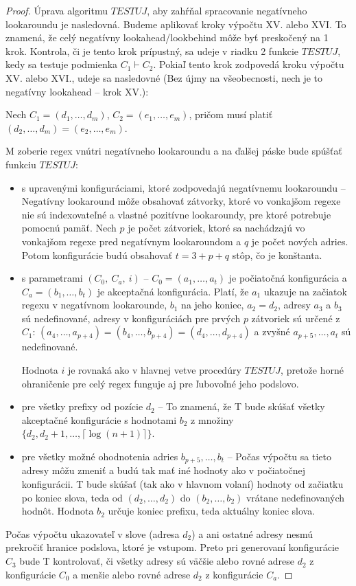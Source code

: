 \begin{proof}
Úprava algoritmu $TESTUJ$, aby zahŕňal spracovanie negatívneho lookaroundu je nasledovná. Budeme aplikovať kroky výpočtu XV. alebo XVI. To znamená, že celý negatívny lookahead/lookbehind môže byť preskočený na 1 krok. Kontrola, či je tento krok prípustný, sa udeje v riadku 2 funkcie $TESTUJ$, kedy sa testuje podmienka $C_1\vdash C_2$. Pokiaľ tento krok zodpovedá kroku výpočtu XV. alebo XVI., udeje sa nasledovné (Bez újmy na všeobecnosti, nech je to negatívny lookahead -- krok XV.):

Nech $C_1=(d_1,\dots,d_m)$, $C_2=(e_1,\dots,e_m)$, pričom musí platiť $(d_2,\dots,d_m)=(e_2,\dots,e_m)$. 

M zoberie regex vnútri negatívneho lookaroundu a na ďalšej páske bude spúšťať funkciu $TESTUJ$:
\begin{itemize}
\item s upravenými konfiguráciami, ktoré zodpovedajú negatívnemu lookaroundu -- Negatívny lookaround môže obsahovať zátvorky, ktoré vo vonkajšom regexe nie sú indexovateľné a vlastné pozitívne lookaroundy, pre ktoré potrebuje pomocnú pamäť. Nech $p$ je počet zátvoriek, ktoré sa nachádzajú vo vonkajšom regexe pred negatívnym lookaroundom a $q$ je počet nových adries. Potom konfigurácie budú obsahovať $t=3+p+q$ stôp, čo je konštanta.
\item s parametrami $(C_0,~C_a,~i)$ -- $C_0 = (a_1,\dots,a_t)$ je počiatočná konfigurácia a $C_a=(b_1,\dots,b_t)$ je akceptačná konfigurácia. Platí, že $a_1$ ukazuje na začiatok regexu v negatívnom lookarounde, $b_1$ na jeho koniec, $a_2=d_2$, adresy $a_3$ a $b_3$ sú nedefinované, adresy v konfiguráciách pre prvých $p$ zátvoriek sú určené z $C_1$: $(a_4,\dots,a_{p+4}) = (b_4,\dots,b_{p+4}) = (d_4,\dots,d_{p+4})$ a zvyšné $a_{p+5},\dots,a_t$ sú nedefinované.

Hodnota $i$ je rovnaká ako v hlavnej vetve procedúry $TESTUJ$, pretože horné ohraničenie pre celý regex funguje aj pre ľubovoľné jeho podslovo.
\item pre všetky prefixy od pozície $d_2$ -- To znamená, že T bude skúšať všetky akceptačné konfigurácie s hodnotami $b_2$ z množiny $\lbrace d_2, d_2+1,\dots,\lceil \log(n+1)\rceil\rbrace$.
\item pre všetky možné ohodnotenia adries $b_{p+5},\dots,b_t$ -- Počas výpočtu sa tieto adresy môžu zmeniť a budú tak mať iné hodnoty ako v počiatočnej konfigurácii. T bude skúšať (tak ako v hlavnom volaní) hodnoty od začiatku po koniec slova, teda od $(d_2,\dots,d_2)$ do $(b_2,\dots,b_2)$ vrátane nedefinovaných hodnôt. Hodnota $b_2$ určuje koniec prefixu, teda aktuálny koniec slova.
\end{itemize}
Počas výpočtu ukazovateľ v slove (adresa $d_2$) a ani ostatné adresy nesmú prekročiť hranice podslova, ktoré je vstupom. Preto pri generovaní konfigurácie $C_3$ bude T kontrolovať, či všetky adresy sú väčšie alebo rovné adrese $d_2$ z konfigurácie $C_0$ a menšie alebo rovné adrese $d_2$ z konfigurácie $C_a$.


\end{proof}
